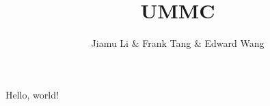 \documentclass{article}
\title{UMMC}
\author{Jiamu Li \& Frank Tang \& Edward Wang}
\begin{document}
\maketitle

Hello, world!
\newpage
\inputminted{cpp}{ummrc.cpp}
\end{document}
